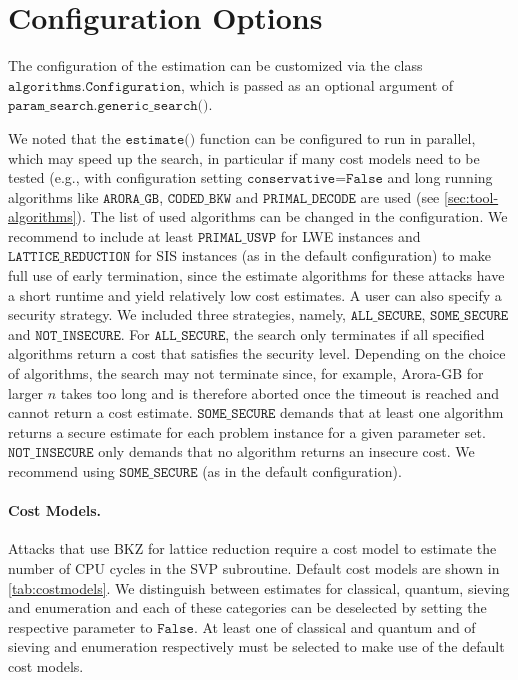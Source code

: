 \section{Configuration Options}\label{sec:config-options}
The configuration of the estimation can be customized via the class $\texttt{algorithms.Configuration}$, which is passed as an optional argument of $\texttt{param\_search.generic\_search()}$.

We noted that the $\texttt{estimate()}$ function can be configured to run in parallel, which may speed up the search, in particular if many cost models need to be tested (e.g., with configuration setting $\texttt{conservative=False}$ and long running algorithms like $\texttt{ARORA\_GB}$, $\texttt{CODED\_BKW}$ and $\texttt{PRIMAL\_DECODE}$ are used (see \cref{sec:tool-algorithms}). The list of used algorithms can be changed in the configuration. We recommend to include at least $\texttt{PRIMAL\_USVP}$ for LWE instances and $\texttt{LATTICE\_REDUCTION}$ for SIS instances (as in the default configuration) to make full use of early termination, since the estimate algorithms for these attacks have a short runtime and yield relatively low cost estimates. A user can also specify a security strategy. We included three strategies, namely, $\texttt{ALL\_SECURE}$, $\texttt{SOME\_SECURE}$ and $\texttt{NOT\_INSECURE}$. For $\texttt{ALL\_SECURE}$, the search only terminates if all specified algorithms return a cost that satisfies the security level. Depending on the choice of algorithms, the search may not terminate since, for example, Arora-GB for larger $n$ takes too long and is therefore aborted once the timeout is reached and cannot return a cost estimate. $\texttt{SOME\_SECURE}$ demands that at least one algorithm returns a secure estimate for each problem instance for a given parameter set. $\texttt{NOT\_INSECURE}$ only demands that no algorithm returns an insecure cost. We recommend using $\texttt{SOME\_SECURE}$ (as in the default configuration).


\paragraph{Cost Models.} \label{sec:tool-costmodels} Attacks that use BKZ for lattice reduction require a cost model to estimate the number of CPU cycles in the SVP subroutine. Default cost models are shown in \cref{tab:costmodels}. We distinguish between estimates for classical, quantum, sieving and enumeration and each of these categories can be deselected by setting the respective parameter to $\texttt{False}$. At least one of classical and quantum and of sieving and enumeration respectively must be selected to make use of the default cost models.

